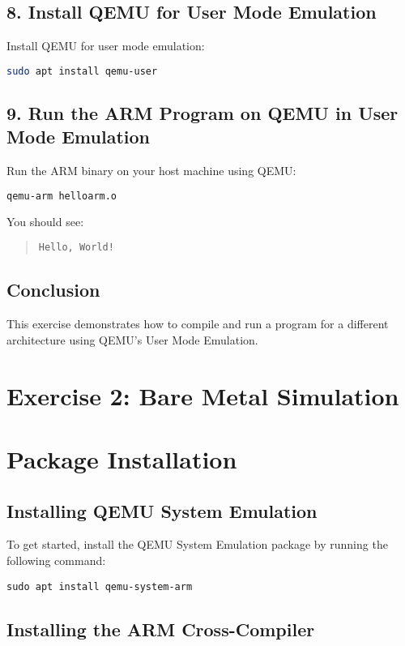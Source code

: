 \subsection*{8. Install QEMU for User Mode Emulation}
Install QEMU for user mode emulation:
\begin{lstlisting}[language=bash]
sudo apt install qemu-user
\end{lstlisting}

\subsection*{9. Run the ARM Program on QEMU in User Mode Emulation}
Run the ARM binary on your host machine using QEMU:
\begin{lstlisting}[language=bash]
qemu-arm helloarm.o
\end{lstlisting}
You should see:
\begin{quote}
\texttt{Hello, World!}
\end{quote}

\subsection{Conclusion}
This exercise demonstrates how to compile and run a program for a different architecture using QEMU's User Mode Emulation.

\section{Exercise 2: Bare Metal Simulation}
\section*{Package Installation}

\subsection*{Installing QEMU System Emulation}

To get started, install the QEMU System Emulation package by running the following command:

\begin{lstlisting}
sudo apt install qemu-system-arm
\end{lstlisting}

\subsection*{Installing the ARM Cross-Compiler}

